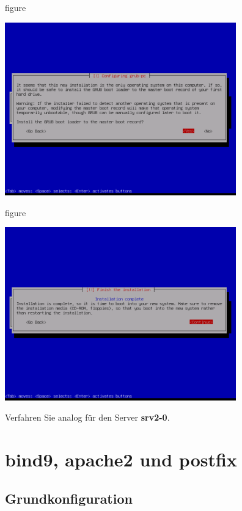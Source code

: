 \begin{nofloat}{figure}
\begin{center}
\includegraphics[width=0.75\textwidth]{screenshots/35_ubuntu_install.png}
\end{center}
\end{nofloat}

\begin{nofloat}{figure}
\begin{center}
\includegraphics[width=0.75\textwidth]{screenshots/36_ubuntu_install.png}
\end{center}
\end{nofloat}

Verfahren Sie analog für den Server \textbf{srv2-0}.

\section{bind9, apache2 und postfix}

\subsection{Grundkonfiguration}

